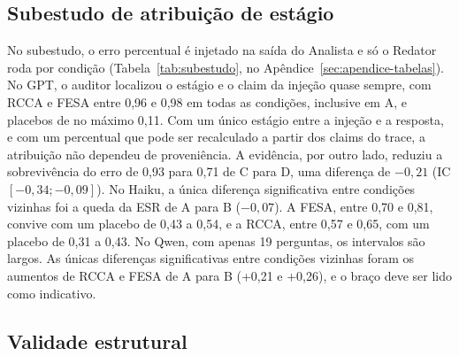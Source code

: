 \subsection{Subestudo de atribuição de estágio}\label{sec:res-subestudo}

No subestudo, o erro percentual é injetado na saída do Analista e só o Redator roda por condição (Tabela~\ref{tab:subestudo}, no Apêndice~\ref{sec:apendice-tabelas}).
No GPT, o auditor localizou o estágio e o claim da injeção quase sempre, com RCCA e FESA entre 0,96 e 0,98 em todas as condições, inclusive em A, e placebos de no máximo 0,11.
Com um único estágio entre a injeção e a resposta, e com um percentual que pode ser recalculado a partir dos claims do trace, a atribuição não dependeu de proveniência.
A evidência, por outro lado, reduziu a sobrevivência do erro de 0,93 para 0,71 de C para D, uma diferença de $-0{,}21$ (IC $[-0{,}34; -0{,}09]$).
No Haiku, a única diferença significativa entre condições vizinhas foi a queda da ESR de A para B ($-0{,}07$). A FESA, entre 0,70 e 0,81, convive com um placebo de 0,43 a 0,54, e a RCCA, entre 0,57 e 0,65, com um placebo de 0,31 a 0,43.
No Qwen, com apenas 19 perguntas, os intervalos são largos. As únicas diferenças significativas entre condições vizinhas foram os aumentos de RCCA e FESA de A para B (+0,21 e +0,26), e o braço deve ser lido como indicativo.

\subsection{Validade estrutural}\label{sec:res-validade}

